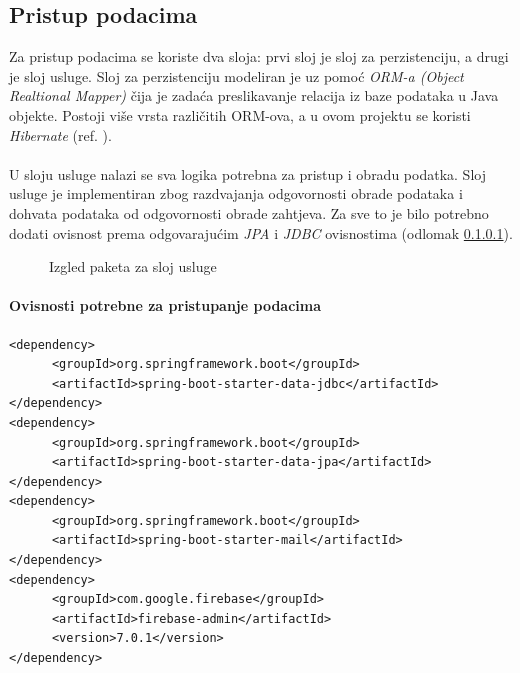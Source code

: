 \documentclass[times, utf8, zavrsni]{fer}
\begin{document}
\subsection{Pristup podacima}
Za pristup podacima se koriste dva sloja: prvi sloj je sloj za perzistenciju, a drugi je sloj usluge. Sloj za perzistenciju
modeliran je uz pomoć \textit{ORM-a (Object Realtional Mapper)} čija je zadaća preslikavanje relacija
iz baze podataka u Java objekte. Postoji više vrsta različitih ORM-ova, a u ovom projektu se koristi \textit{Hibernate} (ref. \cite{Hibernate}).
\\\\
U sloju usluge nalazi se sva logika potrebna za pristup i obradu podatka.
Sloj usluge je implementiran zbog razdvajanja odgovornosti obrade podataka i dohvata podataka od odgovornosti obrade zahtjeva.
Za sve to je bilo potrebno dodati ovisnost prema odgovarajućim
\textit{JPA} i \textit{JDBC} ovisnostima (odlomak \ref{dataAccess}).
\begin{figure}[h]
      \centering
      \caption{Izgled paketa za sloj usluge}
      \label{fig:services}
\end{figure}
\paragraph{Ovisnosti potrebne za pristupanje podacima}
\label{dataAccess}
\begin{Verbatim}[fontsize=\scriptsize]
<dependency>
      <groupId>org.springframework.boot</groupId>
      <artifactId>spring-boot-starter-data-jdbc</artifactId>
</dependency>
<dependency>
      <groupId>org.springframework.boot</groupId>
      <artifactId>spring-boot-starter-data-jpa</artifactId>
</dependency>
<dependency>
      <groupId>org.springframework.boot</groupId>
      <artifactId>spring-boot-starter-mail</artifactId>
</dependency>
<dependency>
      <groupId>com.google.firebase</groupId>
      <artifactId>firebase-admin</artifactId>
      <version>7.0.1</version>
</dependency>
\end{Verbatim}
\end{document}
